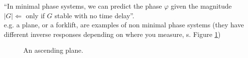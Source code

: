 ``In minimal phase systems, we can predict the phase $\varphi$ given
the magnitude $|G| \Leftarrow$ only if $G$ stable with no time delay''.\\

e.g. a plane, or a forklift, are examples of non minimal phase systems
(they have different inverse responses depending on where you measure,
s. Figure \ref{fig:plane})

\begin{figure}[H]
    \centering
    \caption{An ascending plane.}
    \label{fig:plane}
\end{figure}

